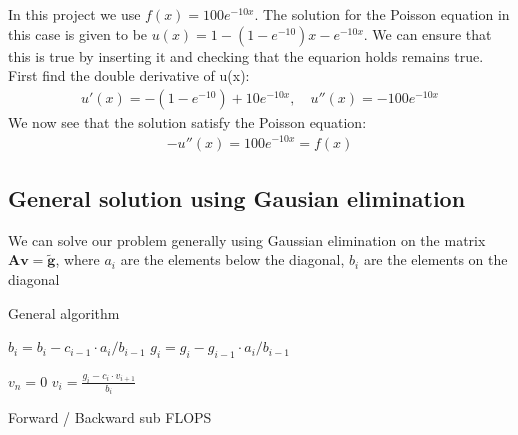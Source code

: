 \documentclass[american,a4paper,12pt]{article}
\renewcommand{\vec}[1]{\mathbf{#1}} %
\begin{document}
  In this project we use $f(x) = 100e^{-10x}$. The solution for the Poisson equation in this case is given to be $u(x) = 1 - (1 - e^{-10})x - e^{-10x}$. We can ensure that this is true by inserting it and checking that the equarion holds remains true. First find the double derivative of u(x):
  \begin{align*}
    u'(x) = -(1 - e^{-10}) + 10e^{-10x}, \quad u''(x) = -100e^{-10x}
  \end{align*}
  We now see that the solution satisfy the Poisson equation:
  \begin{align*}
    -u''(x) = 100e^{-10x} = f(x)
  \end{align*}
  \subsection{General solution using Gausian elimination}
  We can solve our problem generally using Gaussian elimination on the matrix $\vec{A}\vec{v} = \vec{\tilde{g}}$, where $a_i$ are the elements below the diagonal, $b_i$ are the elements on the diagonal

\begin{algorithm}
\caption{General algorithm}
\begin{algorithmic}[1] %
   
    \State $b_i = b_i - c_{i-1}\cdot {a_i}/{{b}_{i-1}}$ 
    \State $g_i = g_i - {g}_{i-1}\cdot {a_i}/{{b}_{i-1}}$ 
  \EndFor
    
  \Statex 
  \State $v_n = 0$ 
    \State $v_i = \frac{g_i - c_i\cdot v_{i+1}}{b_i}$
  \EndFor
\end{algorithmic}
\end{algorithm}
    
    Forward / Backward sub
    FLOPS
\end{document}

